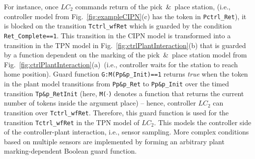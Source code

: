 For instance, once $LC_2$ commands return of the pick~\&~place station, (i.e., controller model from Fig.~\ref{fig:exampleCIPN}(c) has the token in \verb!Pctrl_Ret!), it is blocked on the transition \verb!Tctrl_wfRet! which is guarded by the condition \verb!Ret_Complete==1!. This transition in the CIPN model is transformed into a transition in the TPN model in Fig.~\ref{fig:ctrlPlantInteraction}(b) that is guarded by a function dependent on the marking of the pick~\&~place station model from Fig.~\ref{fig:ctrlPlantInteraction}(a)~(i.e., controller waits for the station to reach home position). Guard function \verb!G:M(Pp&p_Init)==1! returns \emph{true} when the token in the plant model transitions from \verb!Pp&p_Ret! to \verb!Pp&p_Init! over the timed transition \verb!Tp&p_RetInit! (here, \verb!M(!$\cdot$\verb!)! denotes a function that returns the current number of tokens inside the argument place) -- hence, controller $LC_2$ can transition over \verb!Tctrl_wfRet!. Therefore, this guard function is used for the transition \verb!Tctrl_wfRet! in the TPN model of $LC_2$. This models the controller side of the controller-plant interaction, i.e., sensor sampling. More complex conditions based on multiple sensors are implemented by forming an arbitrary plant marking-dependent Boolean guard function.



